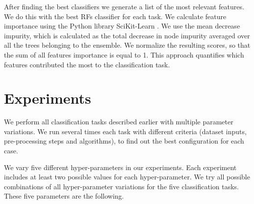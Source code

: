 \documentclass[a4paper,fleqn,usenatbib]{mnras}
\begin{document}
After finding the best classifiers we generate a list of the most
relevant features. 
We do this with the best RFs classifier for each task.
We calculate feature importance using the Python library 
SciKit-Learn \citep{1201.0490}. We use the mean decrease impurity, 
which is calculated as the total decrease in node impurity averaged over all the trees belonging to
the ensemble.
We normalize the resulting scores, so that the sum of all features
importance is equal to 1.
This approach quantifies which features contributed the most to the
classification task.  



\section{Experiments} \label{section_experimentation}

We perform all classification tasks described earlier with multiple
parameter variations.  
We run several times each task with different criteria 
(dataset inputs, pre-processing steps and algorithms), 
to find out the best configuration for each case.

We vary five different hyper-parameters in our experiments.
Each experiment includes at least two possible values for each
hyper-parameter.
We try all possible combinations of all hyper-parameter variations 
for the five classification tasks. 
These five parameters are the following. 
\end{document}
